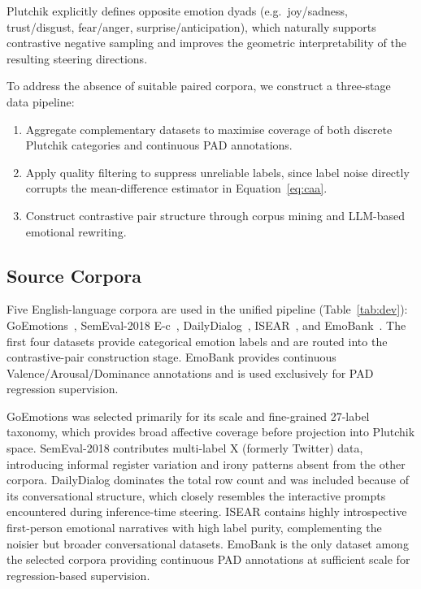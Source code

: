 \documentclass[12pt,twoside]{report}
\begin{document}
Plutchik explicitly defines opposite emotion dyads (e.g.\ joy/sadness, trust/disgust, fear/anger, surprise/anticipation), which naturally supports contrastive negative sampling and improves the geometric interpretability of the resulting steering directions.

To address the absence of suitable paired corpora, we construct a three-stage data pipeline:

\begin{enumerate}
    \item Aggregate complementary datasets to maximise coverage of both discrete Plutchik categories and continuous PAD annotations.
    \item Apply quality filtering to suppress unreliable labels, since label noise directly corrupts the mean-difference estimator in Equation~\ref{eq:caa}.
    \item Construct contrastive pair structure through corpus mining and LLM-based emotional rewriting.
\end{enumerate}

\subsection{Source Corpora}

Five English-language corpora are used in the unified pipeline (Table~\ref{tab:dev}): GoEmotions~\cite{demszky2020goemotionsdatasetfinegrainedemotions}, SemEval-2018 E-c~\cite{mohammad2018semeval}, DailyDialog~\cite{li2017dailydialogmanuallylabelledmultiturn}, ISEAR~\cite{scherer1990isear}, and EmoBank~\cite{buechel2022emobankstudyingimpactannotation}. The first four datasets provide categorical emotion labels and are routed into the contrastive-pair construction stage. EmoBank provides continuous Valence/Arousal/Dominance annotations and is used exclusively for PAD regression supervision.

GoEmotions was selected primarily for its scale and fine-grained 27-label taxonomy, which provides broad affective coverage before projection into Plutchik space. SemEval-2018 contributes multi-label X (formerly Twitter) data, introducing informal register variation and irony patterns absent from the other corpora. DailyDialog dominates the total row count and was included because of its conversational structure, which closely resembles the interactive prompts encountered during inference-time steering. ISEAR contains highly introspective first-person emotional narratives with high label purity, complementing the noisier but broader conversational datasets. EmoBank is the only dataset among the selected corpora providing continuous PAD annotations at sufficient scale for regression-based supervision.
\end{document}
